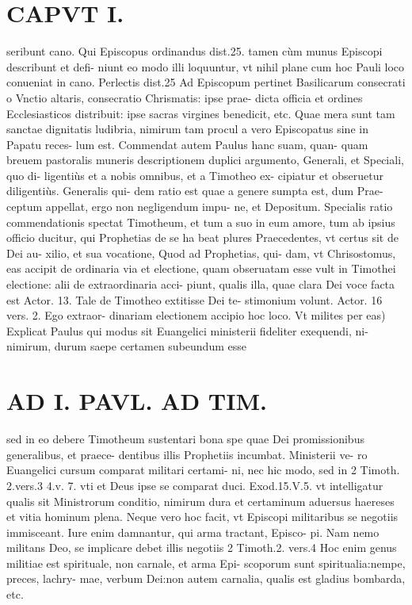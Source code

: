 \documentclass{article}
\begin{document}
\begin{pages}
\section*{CAPVT I. }
\marginpar{[ p.35 ]}\pstart seribunt cano. Qui Episcopus ordinandus dist.25. tamen cùm munus Episcopi describunt et defi- niunt eo modo illi loquuntur, vt nihil plane cum hoc Pauli loco conueniat in cano. Perlectis dist.25 Ad Episcopum pertinet Basilicarum consecrati o Vnctio altaris, consecratio Chrismatis: ipse prae- dicta officia et ordines Ecclesiasticos distribuit: ipse sacras virgines benedicit, etc. Quae mera sunt tam sanctae dignitatis ludibria, nimirum tam procul a vero Episcopatus sine in Papatu reces- lum est.  \pend\pstart Commendat autem Paulus hanc suam, quan- quam breuem pastoralis muneris descriptionem duplici argumento, Generali, et Speciali, quo di- ligentiùs et a nobis omnibus, et a Timotheo ex- cipiatur et obseruetur diligentiùs. Generalis qui- dem ratio est quae a genere sumpta est, dum Prae- ceptum appellat, ergo non negligendum impu- ne, et Depositum. Specialis ratio commendationis spectat Timotheum, et tum a suo in eum amore, tum ab ipsius officio ducitur, qui Prophetias de se ha beat plures Praecedentes, vt certus sit de Dei au- xilio, et sua vocatione, Quod ad Prophetias, qui- dam, vt Chrisostomus, eas accipit de ordinaria via et electione, quam obseruatam esse vult in Timothei electione: alii de extraordinaria acci- piunt, qualis illa, quae clara Dei voce facta est Actor. 13. Tale de Timotheo extitisse Dei te- stimonium volunt. Actor. 16 vers. 2. Ego extraor- dinariam electionem accipio hoc loco.  \pend\pstart Vt milites per eas) Explicat Paulus qui modus sit Euangelici ministerii fideliter exequendi, ni- nimirum, durum saepe certamen subeundum esse  \pend
\section*{AD I. PAVL. AD TIM. }
\marginpar{[ p.36 ]}\pstart sed in eo debere Timotheum sustentari bona spe quae Dei promissionibus generalibus, et praece- dentibus illis Prophetiis incumbat. Ministerii ve- ro Euangelici cursum comparat militari certami- ni, nec hic modo, sed in 2 Timoth. 2.vers.3 4.v. 7. vti et Deus ipse se comparat duci. Exod.15.V.5. vt intelligatur qualis sit Ministrorum conditio, nimirum dura et certaminum aduersus haereses et vitia hominum plena. Neque vero hoc facit, vt Episcopi militaribus se negotiis immisceant. Iure enim damnantur, qui arma tractant, Episco- pi. Nam nemo militans Deo, se implicare debet illis negotiis 2 Timoth.2. vers.4 Hoc enim genus militiae est spirituale, non carnale, et arma Epi- scoporum sunt spiritualia:nempe, preces, lachry- mae, verbum Dei:non autem carnalia, qualis est gladius bombarda, etc.  \pend
{}
{}

\end{pages}
\end{document}
